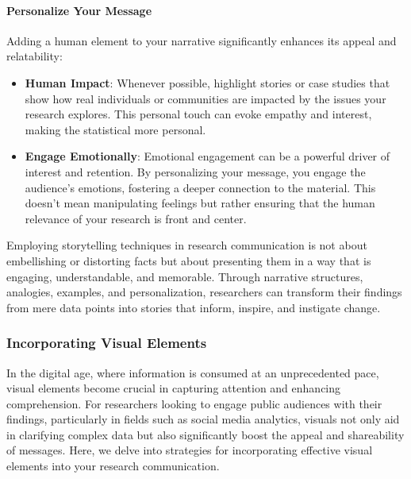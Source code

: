 \documentclass[
]{book}
\begin{document}
\hypertarget{personalize-your-message}{%
\paragraph{Personalize Your Message}\label{personalize-your-message}}

Adding a human element to your narrative significantly enhances its appeal and relatability:

\begin{itemize}
\item
  \textbf{Human Impact}: Whenever possible, highlight stories or case studies that show how real individuals or communities are impacted by the issues your research explores. This personal touch can evoke empathy and interest, making the statistical more personal.
\item
  \textbf{Engage Emotionally}: Emotional engagement can be a powerful driver of interest and retention. By personalizing your message, you engage the audience's emotions, fostering a deeper connection to the material. This doesn't mean manipulating feelings but rather ensuring that the human relevance of your research is front and center.
\end{itemize}

Employing storytelling techniques in research communication is not about embellishing or distorting facts but about presenting them in a way that is engaging, understandable, and memorable. Through narrative structures, analogies, examples, and personalization, researchers can transform their findings from mere data points into stories that inform, inspire, and instigate change.

\hypertarget{incorporating-visual-elements}{%
\subsubsection*{Incorporating Visual Elements}\label{incorporating-visual-elements}}

In the digital age, where information is consumed at an unprecedented pace, visual elements become crucial in capturing attention and enhancing comprehension. For researchers looking to engage public audiences with their findings, particularly in fields such as social media analytics, visuals not only aid in clarifying complex data but also significantly boost the appeal and shareability of messages. Here, we delve into strategies for incorporating effective visual elements into your research communication.
\end{document}
